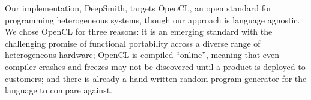 
Our implementation, DeepSmith, targets OpenCL, an open standard for programming heterogeneous systems, though our approach is language agnostic. We chose OpenCL for three reasons: it is an emerging standard with the challenging promise of functional portability across a diverse range of heterogeneous hardware; OpenCL is compiled ``online'', meaning that even compiler crashes and freezes may not be discovered until a product is deployed to customers; and there is already a hand written random program generator for the language to compare against.  


